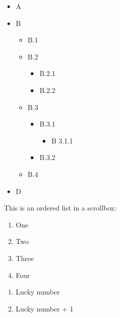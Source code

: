 \begin{itemize}
\item 
\par A 
\item 
\par B
\begin{itemize}
\item 
\par B.1 
\item 
\par B.2
\begin{itemize}
\item 
\par B.2.1 
\item 
\par B.2.2
\end{itemize}

\par 
\item 
\par B.3
\begin{itemize}
\item 
\par B.3.1
\begin{itemize}
\item 
\par B 3.1.1
\end{itemize}

\par 
\item 
\par B.3.2
\end{itemize}

\par 
\item 
\par B.4
\end{itemize}

\par 
\item 
\par D
\end{itemize}

\par This is an ordered list in a scrollbox:
\begin{enumerate}
\item 
\par One 
\item 
\par Two 
\item 
\par Three 
\item 
\par Four
\end{enumerate}

\begin{enumerate}
\item 
\par Lucky number 
\item 
\par Lucky number + 1
\end{enumerate}
